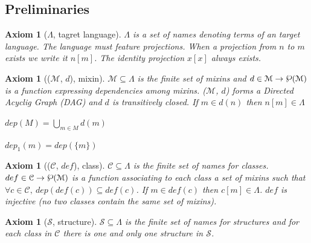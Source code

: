\documentclass[a4paper,UKenglish,cleveref, autoref]{lipics-v2019}
\newcommand{\Lang}{\ensuremath{\Lambda}}
\newcommand{\mixin}{mixin}
\newcommand{\mixins}{mixins}
\newcommand{\M}{\ensuremath{\mathcal{M}}}
\newcommand{\depx}{\ensuremath{d}}
\newcommand{\dep}{\ensuremath{dep}}
\newcommand{\depone}{\ensuremath{dep_1}}
\newcommand{\powerset}[1]{\raisebox{.15\baselineskip}{\Large\ensuremath{\wp}}(#1)}
\newcommand{\C}{\ensuremath{\mathcal{C}}}
\newcommand{\class}{class}
\newcommand{\classes}{classes}
\newcommand{\cdef}{\ensuremath{def}}
\newcommand{\Str}{\ensuremath{\mathcal{S}}}
\newcommand{\structure}{structure}
\newcommand{\structures}{structures}
\newcommand{\proj}[2]{\ensuremath{#1[#2]}}
\theoremstyle{implem}
\theoremstyle{implem}
\newcounter{axiomcounter}
\theoremstyle{axiom}
\newtheorem{axiom}[axiomcounter]{Axiom}
\theoremstyle{abscommand}
\theoremstyle{command}
\begin{document}
\subsection{Preliminaries}

\begin{axiom}[\Lang{}, tagret language]\label{def:universe}
  \Lang{} is a set of names denoting terms of an target language.
  The language must feature projections. When
  a projection from $n$ to $m$ exists we write it \proj{n}{m}.
  The identity projection \proj{x}{x} always exists.
\end{axiom}

\begin{axiom}[(\M{}, \depx{}), \mixin{}]\label{def:mixin}
\( \M{} \subseteq \Lang{} \) is the finite set of \mixins{} and
\( \depx \in \M{} \to \powerset\M{} \) is a function expressing
dependencies among \mixins{}.
(\M{}, \depx{}) forms a Directed Acyclig Graph (DAG) and
\depx{} is transitively closed.
If \(m \in \depx{}(n) \) then \( \proj{n}{m} \in \Lang{} \)
\end{axiom}

\begin{definition}[\(\dep \in \powerset{\M{}} \to \powerset\M{}\)]\label{def:depxs}
\(
  \dep{}(M) = \bigcup_{m \in M} \depx (m)
\)
\end{definition}

\begin{definition}[\(\depone{} \in \M{} \to \powerset\M{}\)]\label{def:dep}
\(\depone{}(m) = \dep{}(\{m\})\)
\end{definition}

\begin{axiom}[(\C{}, \cdef{}), \class{}]\label{def:class}
\(\C{} \subseteq \Lang{}\) is the finite set of names for \classes{}.
\(\cdef{} \in \C \to \powerset\M{}\) is a function associating to
each \class{} a set of \mixins{}
such that \(\forall c \in \C{},~ \dep{}(\cdef{}(c)) \subseteq \cdef{}(c)\).
If \(m \in \cdef{}(c) \) then \( \proj{c}{m} \in \Lang{} \).
\cdef{} is injective (no two \classes{} contain the same set of \mixins{}).
\end{axiom}

\begin{axiom}[\Str{}, \structure{}]\label{def:structure}
\(\Str{} \subseteq \Lang{} \) is the finite set of names for \structures{}
and for each \class{} in \C{} there is one and only one \structure{}
in \Str{}.
\end{axiom}
\end{document}
